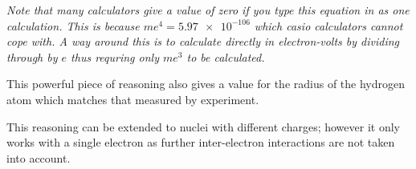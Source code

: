 \documentclass[revision-guide.tex]{subfiles}
\begin{document}
\emph{Note that many calculators give a value of zero if you type this equation in as one calculation. This is because $me^4 = \num{5.97e-106}$ which casio calculators cannot cope with. A way around this is to calculate directly in electron-volts by dividing through by $e$ thus requring only $me^3$ to be calculated.}

This powerful piece of reasoning also gives a value for the radius of the hydrogen atom which matches that measured by experiment.

This reasoning can be extended to nuclei with different charges; however it only works with a single electron as further inter-electron interactions are not taken into account.
\end{document}
